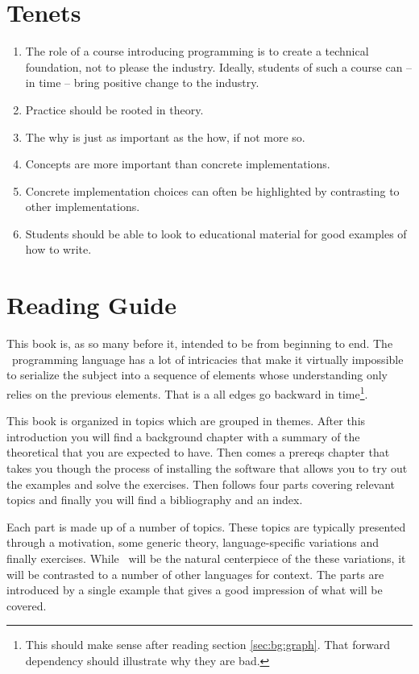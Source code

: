 \section{Tenets}

\begin{enumerate}
  \item The role of a course introducing programming is to create a technical foundation, not to please the industry. Ideally, students of such a course can -- in time -- bring positive change to the industry.
  \item Practice should be rooted in theory.
  \item The why is just as important as the how, if not more so.
  \item Concepts are more important than concrete implementations.
  \item Concrete implementation choices can often be highlighted by contrasting to other implementations.
  \item Students should be able to look to educational material for good examples of how to write.
\end{enumerate}

\section{Reading Guide}

This book is, as so many before it, intended to be  from beginning to end. The \csharp\ programming language has a lot of intricacies that make it virtually impossible to serialize the subject into a sequence of elements whose understanding only relies on the previous elements. That is a  all edges go backward in time\footnote{This should make sense after reading section \ref{sec:bg:graph}. That forward dependency should illustrate why they are bad.}.

This book is organized in topics which are grouped in themes. After this introduction you will find a background chapter with a summary of the theoretical that you are expected to have. Then comes a prereqs chapter that takes you though the process of installing the software that allows you to try out the examples and solve the exercises. Then follows four parts covering relevant topics and finally you will find a bibliography and an index.

Each part is made up of a number of topics. These topics are typically presented through a motivation, some generic theory, language-specific variations and finally exercises. While \csharp\ will be the natural centerpiece of the these variations, it will be contrasted to a number of other languages for context. The parts are introduced by a single example that gives a good impression of what will be covered.


